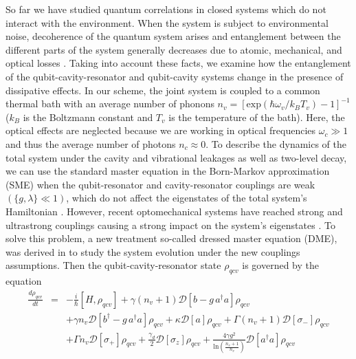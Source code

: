 So far we have studied quantum correlations in closed systems which do not interact with the environment. When the system is subject to environmental noise, decoherence of the quantum system arises and entanglement between the different parts of the system generally decreases due to atomic, mechanical, and optical losses \cite{montenegro2019mechanical}. Taking into account these facts, we examine how the entanglement of the qubit-cavity-resonator and qubit-cavity systems change in the presence of dissipative effects. In our scheme, the joint system is coupled to a common thermal bath with an average number of phonons $n_{v}=\left[\textrm{exp}\left(\hbar \omega_{v}/k_{B}T_{v}\right)-1\right]^{-1}$ ($k_{B}$ is the Boltzmann constant and $T_{v}$ is the temperature of the bath). Here, the optical effects are neglected because we are working in optical frequencies $\omega_{c}\gg1$ and thus the average number of photons $n_{c} \approx 0$. To describe the dynamics of the total system under the cavity and vibrational leakages as well as two-level decay, we can use the standard master equation in the Born-Markov approximation (SME) when the qubit-resonator and cavity-resonator couplings are weak $\left(\{g, \lambda\} \ll 1 \right)$, which do not affect the eigenstates of the total system's Hamiltonian \cite{naseem2018thermodynamic}. However, recent optomechanical systems have reached strong and ultrastrong couplings causing a strong impact on the system's eigenstates \cite{hu2015quantum}. To solve this problem, a new treatment so-called dressed master equation (DME), was derived in \cite{hu2015quantum, montenegro2017macroscopic}  to study the system evolution under the new couplings assumptions. Then the qubit-cavity-resonator state $\rho_{qcv}$ is governed by the equation 
\begin{eqnarray}\label{dme}
  \frac{d \rho_{qcv}}{dt} &=& -\frac{i}{\hbar} \left[H, \rho_{qcv}\right] 
                              + \gamma \left(n_{v} + 1\right) 
                              \mathcal{D}\left[b - g\,a^{\dagger}a\right]
                              \rho_{qcv}\nonumber\\
                          && + \gamma n_{v} \mathcal{D}
                             \left[b^{\dagger} - g\,a^{\dagger}a\right]
                             \rho_{qcv} + \kappa \mathcal{D}[a]\rho_{qcv} 
                             + \Gamma \left(n_{v} + 1\right) 
                             \mathcal{D} [\sigma_{-}]\rho_{qcv}\nonumber\\
                          && + \Gamma n_{v}\mathcal{D}[\sigma_{+}]
                             \rho_{qcv} + \frac{\gamma_d}{2} 
                             \mathcal{D}[\sigma_{z}]\rho_{qcv} 
                             + \frac{4 \gamma g^{2}}{\textrm{ln}
                             \left(\frac{n_{v}+1}{n_{v}}\right)}
                             \mathcal{D}[a^{\dagger}a]\rho_{qcv}
\end{eqnarray}
